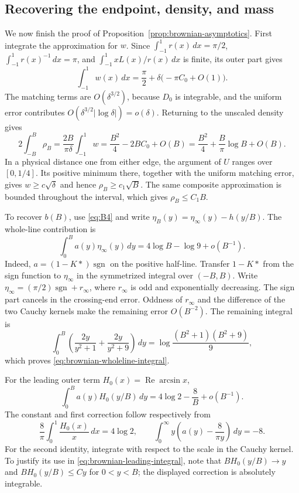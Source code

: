 \subsection{Recovering the endpoint, density, and mass}

We now finish the proof of Proposition~\ref{prop:brownian-asymptotics}.
First integrate the approximation for $w$.  Since
$\int_{-1}^1r(x)\,dx=\pi/2$, $\int_{-1}^1r(x)^{-1}\,dx=\pi$, and
$\int_{-1}^1xL(x)/r(x)\,dx$ is finite, its outer part gives
\[
 \int_{-1}^1w(x)\,dx
       =\frac\pi2+\delta\bigl(-\pi C_0+O(1)\bigr).
\]
The matching terms are $O(\delta^{3/2})$, because $D_0$ is integrable, and
the uniform error contributes $O(\delta^{3/2}|\log\delta|)=o(\delta)$.
Returning to the unscaled density gives
\[
 2\int_{-B}^B\rho_B
 =\frac{2B}{\pi\delta}\int_{-1}^1w
 =\frac{B^2}{4}-2BC_0+O(B)
 =\frac{B^2}{4}+\frac B\pi\log B+O(B).
\]
In a physical distance one from either edge, the argument of $U$ ranges
over $[0,1/4]$.  Its positive minimum there, together with the uniform
matching error, gives $w\ge c\sqrt\delta$ and hence
$\rho_B\ge c_1\sqrt B$.  The same composite approximation is bounded
throughout the interval, which gives $\rho_B\le C_1B$.

To recover $b(B)$, use \eqref{eq:B4} and write
$\eta_B(y)=\eta_\infty(y)-h(y/B)$.  The whole-line contribution is
\begin{equation}
 \int_0^B a(y)\eta_\infty(y)\,dy
             =4\log B-\log9+o(B^{-1}).
 \label{eq:brownian-wholeline-integral}
\end{equation}
Indeed, $a=(1-K*)\operatorname{sgn}$ on the positive half-line.
Transfer $1-K*$ from the sign function to $\eta_\infty$ in the
symmetrized integral over $(-B,B)$.  Write
$\eta_\infty=(\pi/2)\operatorname{sgn}+r_\infty$, where $r_\infty$ is
odd and exponentially decreasing.  The sign part cancels in the
crossing-end error.  Oddness of $r_\infty$ and the difference of the two
Cauchy kernels make the remaining error $O(B^{-2})$.
The remaining integral is
\[
 \int_0^B\left(\frac{2y}{y^2+1}+\frac{2y}{y^2+9}\right)\,dy
 =\log\frac{(B^2+1)(B^2+9)}9,
\]
which proves \eqref{eq:brownian-wholeline-integral}.

For the leading outer term $H_0(x)=\operatorname{Re}\arcsin x$,
\begin{equation}
 \int_0^B a(y)H_0(y/B)\,dy
                   =4\log2-\frac8B+o(B^{-1}).
 \label{eq:brownian-leading-integral}
\end{equation}
The constant and first correction follow respectively from
\[
 \frac8\pi\int_0^1\frac{H_0(x)}x\,dx=4\log2,
 \qquad
 \int_0^\infty y\left(a(y)-\frac8{\pi y}\right)\,dy=-8.
\]
For the second identity, integrate with respect to the scale in the
Cauchy kernel.  To justify its use in
\eqref{eq:brownian-leading-integral}, note that
$B H_0(y/B)\to y$ and $B H_0(y/B)\le C y$ for $0<y<B$;
the displayed correction is absolutely integrable.

